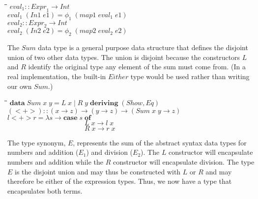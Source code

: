 \documentclass[10pt]{article}
\newlength{\lwidth}\setlength{\lwidth}{4.5cm}
\newlength{\cwidth}\setlength{\cwidth}{8mm} %
\newcommand{\Conid}[1]{\mathit{#1}}
\newcommand{\Varid}[1]{\mathit{#1}}
\begin{document}
\begin{tabbing}
\qquad\=\hspace{\lwidth}\=\hspace{\cwidth}\=\+\kill
${\Varid{eval}_1\mathbin{::}\Varid{Expr}_1\to \Conid{Int}}$\\
${\Varid{eval}_1\;(\Conid{In1}\;\Varid{e1})\mathrel{=}\Varid{\phi_1}\;(\Varid{map1}\;\Varid{eval}_1\;\Varid{e1})}$\\
${}$\\
${\Varid{eval}_2\mathbin{::}\Varid{Expr}_2\to \Conid{Int}}$\\
${\Varid{eval}_2\;(\Conid{In2}\;\Varid{e2})\mathrel{=}\Varid{\phi_2}\;(\Varid{map2}\;\Varid{eval}_2\;\Varid{e2})}$
\end{tabbing}
The \ensuremath{\Conid{Sum}} data type is a general purpose data structure that defines
the disjoint union of two other data types.  The union is disjoint
because the constructors \ensuremath{\Conid{L}} and \ensuremath{\Conid{R}} identify the original type any
element of the sum must come from.  (In a real implementation, the
built-in \ensuremath{\Conid{Either}} type would be used rather than writing our own
\ensuremath{\Conid{Sum}}.)

\begin{tabbing}
\qquad\=\hspace{\lwidth}\=\hspace{\cwidth}\=\+\kill
${\mathbf{data}\;\Conid{Sum}\;\Varid{x}\;\Varid{y}\mathrel{=}\Conid{L}\;\Varid{x}\mid \Conid{R}\;\Varid{y}\;\mathbf{deriving}\;(\Conid{Show},\Conid{Eq})}$\\
${}$\\
${(\mathbin{<+>})\mathbin{::}(\Varid{x}\to \Varid{z})\to (\Varid{y}\to \Varid{z})\to (\Conid{Sum}\;\Varid{x}\;\Varid{y}\to \Varid{z})}$\\
${\Varid{l}\mathbin{<+>}\Varid{r}\mathrel{=}\lambda \Varid{s}\to \mathbf{case}\;\Varid{s}\;\mathbf{of}}$\\
${\phantom{\Varid{l}\mathbin{<+>}\Varid{r}\mathrel{=}\lambda \Varid{s}\to \mathbf{case}\;\Varid{s}\;\mbox{}}\Conid{L}\;\Varid{x}\to \Varid{l}\;\Varid{x}}$\\
${\phantom{\Varid{l}\mathbin{<+>}\Varid{r}\mathrel{=}\lambda \Varid{s}\to \mathbf{case}\;\Varid{s}\;\mbox{}}\Conid{R}\;\Varid{x}\to \Varid{r}\;\Varid{x}}$
\end{tabbing}
The type synonym, \ensuremath{\Conid{E}}, represents the sum of the abstract syntax data
types for numbers and addition (\ensuremath{\Varid{E}_1}) and division (\ensuremath{\Varid{E}_2}).  The \ensuremath{\Conid{L}}
constructor will encapsulate numbers and addition while the \ensuremath{\Conid{R}}
constructor will encapsulate division.  The type \ensuremath{\Conid{E}} is the disjoint
union and may thus be constructed with \ensuremath{\Conid{L}} or \ensuremath{\Conid{R}} and may therefore
be either of the expression types.  Thus, we now have a type that
encapsulates both terms.
\end{document}
